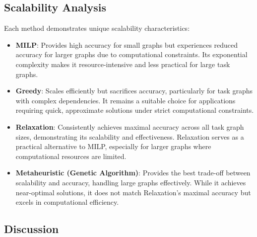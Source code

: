 \documentclass[conference]{IEEEtran}
\begin{document}

\subsection{Scalability Analysis}

Each method demonstrates unique scalability characteristics:
\begin{itemize}
\item \textbf{MILP}: Provides high accuracy for small graphs but experiences reduced accuracy for larger graphs due to computational constraints. Its exponential complexity makes it resource-intensive and less practical for large task graphs.
\item \textbf{Greedy}: Scales efficiently but sacrifices accuracy, particularly for task graphs with complex dependencies. It remains a suitable choice for applications requiring quick, approximate solutions under strict computational constraints.
\item \textbf{Relaxation}: Consistently achieves maximal accuracy across all task graph sizes, demonstrating its scalability and effectiveness. Relaxation serves as a practical alternative to MILP, especially for larger graphs where computational resources are limited.
\item \textbf{Metaheuristic (Genetic Algorithm)}: Provides the best trade-off between scalability and accuracy, handling large graphs effectively. While it achieves near-optimal solutions, it does not match Relaxation’s maximal accuracy but excels in computational efficiency.
\end{itemize}

\subsection{Discussion}
\end{document}
